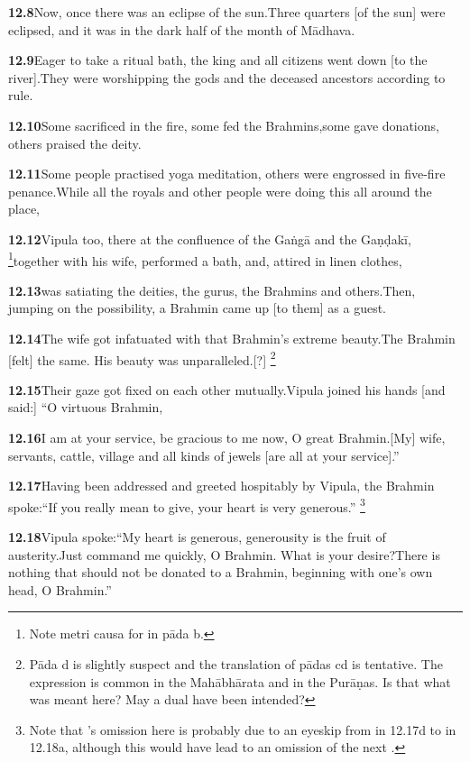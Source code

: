 \textbf{12.8}Now, once there was an eclipse of the sun.Three quarters [of the sun] were eclipsed, and it was in the dark half of the month of Mādhava.%


\textbf{12.9}Eager to take a ritual bath, the king and all citizens went down [to the river].They were worshipping the gods and the deceased ancestors according to rule.%


\textbf{12.10}Some sacrificed in the fire, some fed the Brahmins,some gave donations, others praised the deity.%


\textbf{12.11}Some people practised yoga meditation, others were engrossed in five-fire penance.While all the royals and other people were doing this all around the place,%


\textbf{12.12}Vipula too, there at the confluence of the Gaṅgā and the Gaṇḍakī,%
\footnote{Note  metri causa for  in pāda b.  }together with his wife, performed a bath, and, attired in linen clothes,%


\textbf{12.13}was satiating the deities, the gurus, the Brahmins and others.Then, jumping on the possibility, a Brahmin came up [to them] as a guest.%


\textbf{12.14}The wife got infatuated with that Brahmin's extreme beauty.The Brahmin [felt] the same. His beauty was unparalleled.[?]%
\footnote{Pāda d is slightly suspect and the translation of pādas cd is                         tentative. The expression  is                          common in the Mahābhārata and in the Purāṇas. Is that what was meant here?                         May a dual have been intended?  }%


\textbf{12.15}Their gaze got fixed on each other mutually.Vipula joined his hands [and said:] ``O virtuous Brahmin,%


\textbf{12.16}I am at your service, be gracious to me now, O great Brahmin.[My] wife, servants, cattle, village and all kinds of jewels [are all at your service].''%


\textbf{12.17}Having been addressed and greeted hospitably by Vipula, the Brahmin spoke:``If you really mean to give, your heart is very generous.''%
\footnote{Note that \msCc's omission here is probably due to an eyeskip from  in                 12.17d to  in 12.18a, although this would have lead to an omission of                 the next .  }%


\textbf{12.18}Vipula spoke:``My heart is generous, generousity is the fruit of austerity.Just command me quickly, O Brahmin. What is your desire?There is nothing that should not be donated to a Brahmin, beginning with one's own head, O Brahmin.''%


